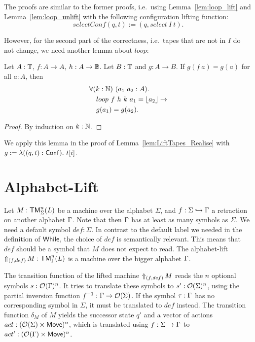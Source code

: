 The proofs are similar to the former proofs, i.e.\ using Lemma~\ref{lem:loop_lift} and Lemma~\ref{lem:loop_unlift} with the following configuration
lifting function:
\[
  selectConf(q,t) := (q, select~I~t).
\]

However, for the second part of the correctness, i.e.\ tapes that are not in $I$ do not change, we need another lemma about $loop$:

\begin{lemma}
  \label{lem:loop_map}
  Let $A:\Type$, $f : A \to A$, $h:A \to \Bool$.  Let $B:\Type$ and $g : A \to B$.  If $g(f~a)=g(a)$ for all $a:A$, then
  \begin{alignat*}{1}
    & \forall (k:\Nat)~(a_1~a_2 : A). \\
    & \quad loop~f~h~k~a_1 = \Some{a_2} \rightarrow \\
    & \quad g(a_1) = g(a_2).
  \end{alignat*}
\end{lemma}
\begin{proof}
  By induction on $k:\Nat$.
\end{proof}

We apply this lemma in the proof of Lemma~\ref{lem:LiftTapes_Realise} with $g := \lambda ((q,t):\Conf).~t[i]$.



\section{Alphabet-Lift}
\label{sec:sigma-Lift}
%

Let $M : \TM_\Sigma^n(L)$ be a machine over the alphabet $\Sigma$, and $f : \Sigma \hookrightarrow \Tau$ a retraction on another alphabet $\Tau$.
Note that then $\Tau$ has at least as many symbols as $\Sigma$.  We need a default symbol $def:\Sigma$.  In contrast to the default label we needed in
the definition of $\While$, the choice of $def$ is semantically relevant.  This means that $def$ should be a symbol that $M$ does not expect to read.
The alphabet-lift $\LiftAlphabet{M}{(f,def)} : \TM_\Tau^n(L)$ is a machine over the bigger alphabet $\Tau$.

The transition function of the lifted machine $\LiftAlphabet{M}{(f,def)}$ reads the $n$ optional symbols $s : \Option(\Tau)^n$.  It tries to translate
these symbols to $s': \Option(\Sigma)^n$, using the partial inversion function $f^{-1} : \Tau \to \Option(\Sigma)$.  If the symbol $\tau:\Tau$ has no
corresponding symbol in $\Sigma$, it must be translated to $def$ instead.  The transition function $\delta_M$ of $M$ yields the successor state $q'$
and a vector of actions $act: (\Option(\Sigma) \times \MS{Move})^n$, which is translated using $f:\Sigma\to\Tau$ to
$act' : (\Option(\Tau) \times \MS{Move})^n$.

